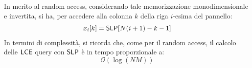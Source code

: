 In merito al random access, considerando tale memorizzazione monodimensionale e
invertita, si ha, per accedere alla colonna $k$ della riga $i$-esima del
pannello: 
\begin{equation}
  \label{eq:raslpform}
  x_i[k] = \mbox{\rm {\sf SLP}}[N(i+1)-k-1]
\end{equation}
In termini di complessità, si ricorda che, come per il random access,
il calcolo delle $\mbox{\rm {\sf LCE}}$ query con $\mbox{\rm {\sf SLP}}$ è in tempo proporzionale a: 
\begin{equation}
  \label{eq:timelce}
  \mathcal{O}(\log (NM))
\end{equation}